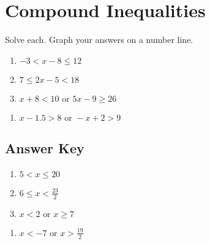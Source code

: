 \chapter{Compound Inequalities}

Solve each. Graph your answers on a number line. 

\begin{multicols}{3}
\begin{enumerate}
	\item $-3 < x-8 \leq 12$
	\item $7 \leq 2x - 5 < 18$
	\item $x + 8 < 10 \text{ or } 5x - 9 \geq 26$
\end{enumerate}	\setcounter{Review}{\value{enumi}}
\end{multicols}
\begin{multicols}{3}
\begin{enumerate}	\setcounter{enumi}{\value{Review}}
	\item $x - 1.5 > 8 \text{ or } -x + 2 > 9$
\end{enumerate}	\setcounter{Review}{\value{enumi}}
\end{multicols}

\newpage

\section*{Answer Key}

\begin{multicols}{3}
\begin{enumerate}	
	\item $5 < x \leq 20$
	\item $6 \leq x < \frac{23}{2}$
	\item $x < 2 \text{ or } x \geq 7$
\end{enumerate}	\setcounter{Review}{\value{enumi}}
\end{multicols}
\begin{multicols}{3}
\begin{enumerate}	\setcounter{enumi}{\value{Review}}
	\item $x < -7 \text{ or } x > \frac{19}{2}$
\end{enumerate}	\setcounter{Review}{\value{enumi}}
\end{multicols}